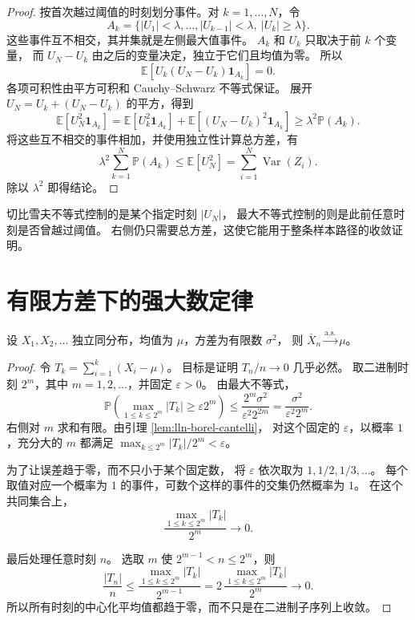 \documentclass[UTF8]{ctexart}
\begin{document}
\begin{proof}
按首次越过阈值的时刻划分事件。对 $k=1,\ldots,N$，令
\[
  A_k=\{|U_1|<\lambda,\ldots,|U_{k-1}|<\lambda,\ |U_k|\geq\lambda\}.
\]
这些事件互不相交，其并集就是左侧最大值事件。
$A_k$ 和 $U_k$ 只取决于前 $k$ 个变量，
而 $U_N-U_k$ 由之后的变量决定，独立于它们且均值为零。
所以
\[
  \mathbb E[U_k(U_N-U_k)\mathbf1_{A_k}]=0.
\]
各项可积性由平方可积和 Cauchy--Schwarz 不等式保证。
展开 $U_N=U_k+(U_N-U_k)$ 的平方，得到
\[
  \mathbb E[U_N^2\mathbf1_{A_k}]
  =\mathbb E[U_k^2\mathbf1_{A_k}]
   +\mathbb E[(U_N-U_k)^2\mathbf1_{A_k}]
  \geq\lambda^2\mathbb P(A_k).
\]
将这些互不相交的事件相加，并使用独立性计算总方差，有
\[
  \lambda^2\sum_{k=1}^N\mathbb P(A_k)
  \leq\mathbb E[U_N^2]
  =\sum_{i=1}^N\operatorname{Var}(Z_i).
\]
除以 $\lambda^2$ 即得结论。
\end{proof}

切比雪夫不等式控制的是某个指定时刻 $|U_N|$，
最大不等式控制的则是此前任意时刻是否曾越过阈值。
右侧仍只需要总方差，这使它能用于整条样本路径的收敛证明。

\section{有限方差下的强大数定律}
\label{sec:lln-strong-finite}

\begin{theorem}[有限方差的强大数定律]
\label{thm:lln-slln-finite}
设 $X_1,X_2,\ldots$ 独立同分布，均值为 $\mu$，方差为有限数 $\sigma^2$，
则 $\overline X_n\xrightarrow{\mathrm{a.s.}}\mu$。
\end{theorem}

\begin{proof}
令 $T_k=\sum_{i=1}^k(X_i-\mu)$。
目标是证明 $T_n/n\to0$ 几乎必然。
取二进制时刻 $2^m$，其中 $m=1,2,\ldots$，并固定 $\varepsilon>0$。
由最大不等式，
\begin{equation}
  \mathbb P\left(
    \max_{1\leq k\leq2^m}|T_k|\geq\varepsilon2^m
  \right)
  \leq\frac{2^m\sigma^2}{\varepsilon^2 2^{2m}}
  =\frac{\sigma^2}{\varepsilon^2 2^m}.
  \label{eq:lln-dyadic-bound}
\end{equation}
右侧对 $m$ 求和有限。由引理 \ref{lem:lln-borel-cantelli}，
对这个固定的 $\varepsilon$，以概率 $1$，充分大的 $m$ 都满足
$\max_{k\leq2^m}|T_k|/2^m<\varepsilon$。

为了让误差趋于零，而不只小于某个固定数，
将 $\varepsilon$ 依次取为 $1,1/2,1/3,\ldots$。
每个取值对应一个概率为 $1$ 的事件，可数个这样的事件的交集仍然概率为 $1$。
在这个共同集合上，
\begin{equation}
  \frac{\max_{1\leq k\leq2^m}|T_k|}{2^m}\longrightarrow0.
  \label{eq:lln-dyadic-convergence}
\end{equation}

最后处理任意时刻 $n$。
选取 $m$ 使 $2^{m-1}<n\leq2^m$，则
\[
  \frac{|T_n|}{n}
  \leq\frac{\max_{1\leq k\leq2^m}|T_k|}{2^{m-1}}
  =2\,\frac{\max_{1\leq k\leq2^m}|T_k|}{2^m}
  \longrightarrow0.
\]
所以所有时刻的中心化平均值都趋于零，而不只是在二进制子序列上收敛。
\end{proof}
\end{document}

